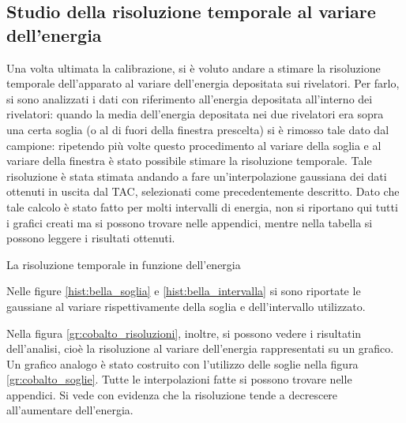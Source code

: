 \subsection{Studio della risoluzione temporale al variare dell'energia}

Una volta ultimata la calibrazione, si è voluto andare a stimare la risoluzione temporale dell'apparato al variare dell'energia depositata sui
rivelatori. Per farlo, si sono analizzati i dati con riferimento all'energia depositata all'interno dei rivelatori: quando la media dell'energia
depositata nei due rivelatori era sopra una certa soglia (o al di fuori della finestra prescelta) si è rimosso tale dato dal campione: ripetendo più
volte questo procedimento al variare della soglia e al variare della finestra è stato possibile stimare la risoluzione temporale. Tale
risoluzione è stata stimata andando a fare un'interpolazione gaussiana dei dati ottenuti in uscita dal TAC, selezionati come precedentemente descritto.
Dato che tale calcolo è stato fatto per molti intervalli di energia, non si riportano qui tutti i grafici creati ma si possono trovare nelle appendici,
mentre nella tabella si possono leggere i risultati ottenuti.\\

%
\begin{tabella}
	\centering
	
	\caption{La risoluzione temporale in funzione dell'energia}
	\label{tab:01tab1}
\end{tabella}
%
Nelle figure \ref{hist:bella_soglia} e \ref{hist:bella_intervalla} si sono riportate le gaussiane al variare rispettivamente della soglia e dell'intervallo utilizzato.


Nella figura \ref{gr:cobalto_risoluzioni}, inoltre, si possono vedere i risultatin dell'analisi, cioè la risoluzione al variare dell'energia rappresentati su un grafico.
Un grafico analogo è stato costruito con l'utilizzo delle soglie nella figura \ref{gr:cobalto_soglie}. Tutte le interpolazioni fatte si possono trovare nelle appendici. Si
vede con evidenza che la risoluzione tende a decrescere all'aumentare dell'energia.
\\
\\


